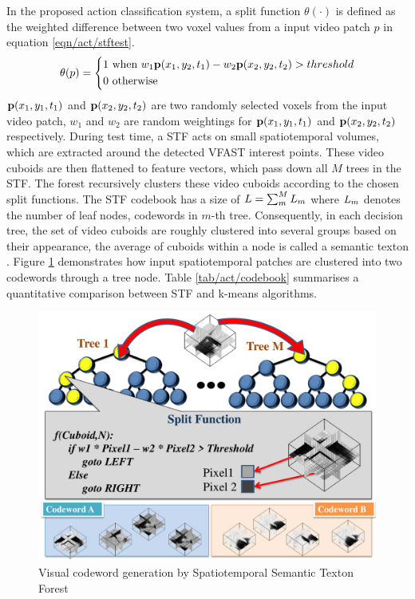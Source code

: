 In the proposed action classification system, a split function $\theta(\cdot)$ is defined as the weighted difference between two voxel values from a input video patch $p$ in equation \ref{eqn/act/stftest}. 
\begin{equation}
	\theta(p) = 
	\left\{
		\begin{aligned}
			1 & \mbox{ when } w_1 \mathbf{p}(x_1,y_2,t_1) - w_2 \mathbf{p}(x_2,y_2,t_2) > threshold \\  
			0 & \mbox{ otherwise } 
		\end{aligned}
	\right.
	\label{eqn/act/stftest}
\end{equation}
$\mathbf{p}(x_1, y_1, t_1)$ and $\mathbf{p}(x_2, y_2, t_2)$ are two randomly selected voxels from the input video patch, $w_1$ and $w_2$ are random weightings for $\mathbf{p}(x_1,y_1,t_1)$ and $\mathbf{p}(x_2,y_2,t_2)$ respectively. 
During test time, a STF acts on small spatiotemporal volumes, which are extracted around the detected VFAST interest points. These video cuboids are then flattened to feature vectors, which pass down all $M$ trees in the STF. 
The forest recursively clusters these video cuboids according to the chosen split functions.  
The STF codebook has a size of $L=\sum_m^M L_m$ where $L_m$ denotes the number of leaf nodes, \ie codewords in $m$-th tree. 
Consequently, in each decision tree, the set of video cuboids are roughly clustered into several groups based on their appearance, the average of cuboids within a node is called a semantic texton \cite{Shotton2008}. 
Figure \ref{fig/act/stf} demonstrates how input spatiotemporal patches are clustered into two codewords through a tree node. Table \ref{tab/act/codebook} summarises a quantitative comparison between STF and k-means algorithms.

\begin{figure}[ht]
	\centering 
	\includegraphics[width=0.8\linewidth]{fig/act/stf_new.pdf} 
	\caption{Visual codeword generation by Spatiotemporal Semantic Texton Forest}
	\label{fig/act/stf}
\end{figure}

